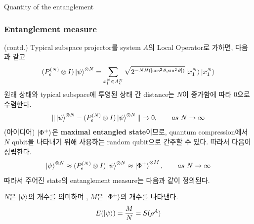 \documentclass[9pt]{beamer}
\begin{document}
\begin{section}{Quantity of the entanglement}
        \begin{frame}
            \frametitle{Entanglement measure}
            (contd.) Typical subspace projector를 system $A$의 Local Operator로 가하면, 다음과 같고
            \begin{equation*}
                (P_\epsilon^{(N)} \otimes I) \ket{\psi}^{\otimes N} = \sum_{x^N_1 \in A_\epsilon^N} \sqrt{2^{-NH([\cos^2 \theta, \sin^2 \theta])}} \ket{x^N_1} \ket{x^N_1}
            \end{equation*}
            원래 상태와 typical subspace에 투영된 상태 간 distance는 $N$이 증가함에 따라 0으로 수렴한다. 
            \begin{equation*}
                \| \ket{\psi}^{\otimes N} - (P_\epsilon^{(N)} \otimes I)\ket{\psi}^{\otimes N}  \| \rightarrow 0,\qquad as\ N \rightarrow \infty
            \end{equation*}
            (아이디어) $\ket{\Phi^+}$은 \textbf{maximal entangled state}이므로, \alert{quantum compression}에서 $N$ qubit을 나타내기 위해 사용하는 random qubit으로 간주할 수 있다. 
            따라서 다음이 성립한다.
            \begin{equation*}
                \ket{\psi}^{\otimes N} \approx (P_\epsilon^{(N)} \otimes I) \ket{\psi}^{\otimes N} \approx \ket{\Phi^+}^{\otimes M},\qquad as \ N \rightarrow \infty
            \end{equation*}
            따라서 주어진 state의 entanglement measure는 다음과 같이 정의된다. 
            \begin{definition}
                $N$은 $\ket{\psi}$의 개수를 의미하며 , $M$은 $\ket{\Phi^+}$의 개수를 나타낸다. 
                \begin{equation*}
                    E(\ket{\psi}) = \frac{M}{N} = S(\rho^A)
                \end{equation*}
            \end{definition}
        \end{frame}


\end{section}
\end{document}
